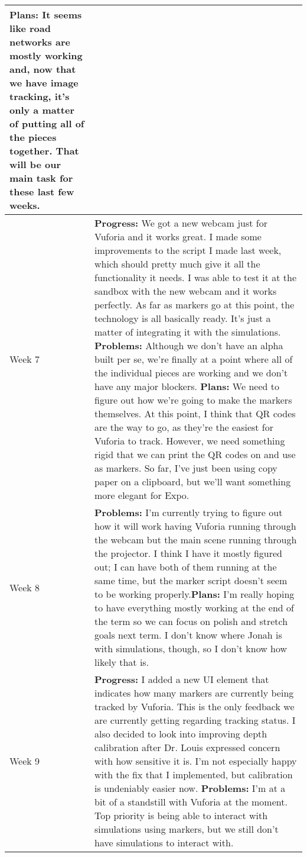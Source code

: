 \documentclass[letterpaper, 10pt, onecolumn, draftclsnofoot]{IEEEtran}
\begin{document}
\begin{center}
\begin{longtable}{|p{4cm}|p{10cm}|}
            \textbf{Plans:} It seems like road networks are mostly working and, now that we have image tracking, it's only a matter of putting all of the pieces together. That will be our main task for these last few weeks.\\
            \hline
            Week 7 & \textbf{Progress:} We got a new webcam just for Vuforia and it works great. I made some improvements to the script I made last week, which should pretty much give it all the functionality it needs. I was able to test it at the sandbox with the new webcam and it works perfectly. As far as markers go at this point, the technology is all basically ready. It's just a matter of integrating it with the simulations.
            \textbf{Problems:} Although we don't have an alpha built per se, we're finally at a point where all of the individual pieces are working and we don't have any major blockers. 
            \textbf{Plans:} We need to figure out how we're going to make the markers themselves. At this point, I think that QR codes are the way to go, as they're the easiest for Vuforia to track. However, we need something rigid that we can print the QR codes on and use as markers. So far, I've just been using copy paper on a clipboard, but we'll want something more elegant for Expo.\\
            \hline
            Week 8 & \textbf{Problems:} I'm currently trying to figure out how it will work having Vuforia running through the webcam but the main scene running through the projector. I think I have it mostly figured out; I can have both of them running at the same time, but the marker script doesn't seem to be working properly.\textbf{Plans:} I'm really hoping to have everything mostly working at the end of the term so we can focus on polish and stretch goals next term. I don't know where Jonah is with simulations, though, so I don't know how likely that is.\\
            \hline
            Week 9 & 
            \textbf{Progress:} I added a new UI element that indicates how many markers are currently being tracked by Vuforia. This is the only feedback we are currently getting regarding tracking status. I also decided to look into improving depth calibration after Dr. Louis expressed concern with how sensitive it is. I'm not especially happy with the fix that I implemented, but calibration is undeniably easier now.
            \textbf{Problems:} I'm at a bit of a standstill with Vuforia at the moment. Top priority is being able to interact with simulations using markers, but we still don't have simulations to interact with. \\

\end{longtable}
\end{center}
\end{document}
